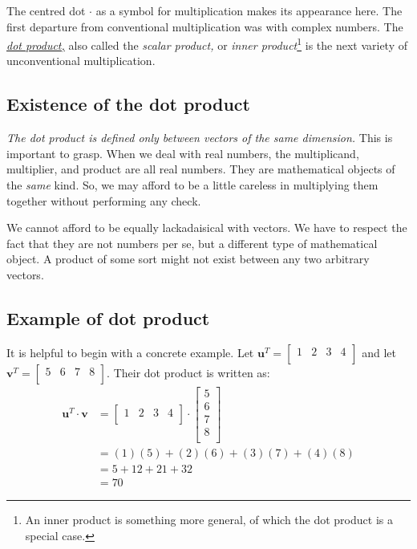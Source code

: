 \documentclass[
  a4paper,
]{article}
\begin{document}
The centred dot \(\cdot\) as a symbol for multiplication makes its
appearance here. The first departure from conventional multiplication
was with complex numbers. The
\href{https://en.wikipedia.org/wiki/Dot_product}{\emph{dot product,}}
also called the \emph{scalar product,} or \emph{inner
product}\footnote{An inner product is something more general, of which
  the dot product is a special case.} is the next variety of
unconventional multiplication.

\hypertarget{existence-of-the-dot-product}{%
\subsection{Existence of the dot
product}\label{existence-of-the-dot-product}}

\emph{The dot product is defined only between vectors of the same
dimension.} This is important to grasp. When we deal with real numbers,
the multiplicand, multiplier, and product are all real numbers. They are
mathematical objects of the \emph{same} kind. So, we may afford to be a
little careless in multiplying them together without performing any
check.

We cannot afford to be equally lackadaisical with vectors. We have to
respect the fact that they are not numbers per se, but a different type
of mathematical object. A product of some sort might not exist between
any two arbitrary vectors.

\hypertarget{example-of-dot-product}{%
\subsection{Example of dot product}\label{example-of-dot-product}}

It is helpful to begin with a concrete example. Let
\(\mathbf{u}^{T} = \begin{bmatrix}1&2&3&4\\\end{bmatrix}\) and let
\(\mathbf{v}^{T} = \begin{bmatrix}5&6&7&8\\\end{bmatrix}\). Their dot
product is written as: \[
\begin{aligned}
\mathbf{u}^{T}\cdot\mathbf{v} &= \begin{bmatrix}1&2&3&4\\\end{bmatrix} \cdot \begin{bmatrix} 5\\6\\7\\8\\ \end{bmatrix}\\
&= (1)(5) + (2)(6) + (3)(7) + (4)(8)\\
&= 5 + 12 + 21 + 32\\
&= 70
\end{aligned}
\]
\end{document}
